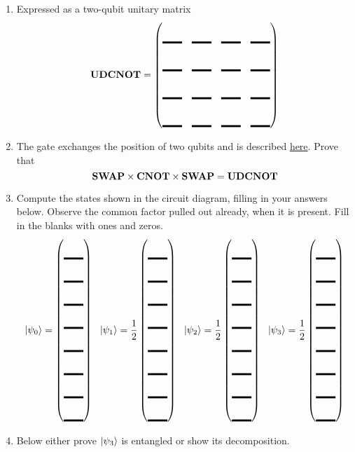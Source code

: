 \documentclass[12pt]{article}
\begin{document}
\begin{enumerate}
\begin{enumerate}[label=\theenumi.\arabic*]
\item Expressed as a two-qubit unitary matrix
\[
\NamedGate{UDCNOT} = \begin{pmatrix*}[r]
\Blank[2em]{} & \Blank[2em]{} & \Blank[2em]{} & \Blank[2em]{}\\[0.5em]
\Blank[2em]{} & \Blank[2em]{} & \Blank[2em]{} & \Blank[2em]{}\\[0.5em]
\Blank[2em]{} & \Blank[2em]{} & \Blank[2em]{} & \Blank[2em]{}\\[0.5em]
\Blank[2em]{} & \Blank[2em]{} & \Blank[2em]{} & \Blank[2em]{}
\end{pmatrix*}
\]
\item The  gate exchanges the position of two qubits and is described \href{https://docs.quantum.ibm.com/api/qiskit/qiskit.circuit.library.SwapGate}{here}. Prove that 
\[
\mbox{\bfseries{\textrm{SWAP}}} \times \mbox{\bfseries{\textrm{CNOT}}} \times \mbox{\bfseries{\textrm{SWAP}}} = \mbox{\bfseries{\textrm{UDCNOT}}}
\]
\LeaveSpace{}
\item Compute the states shown in the circuit diagram, filling in your answers below. Observe the common factor pulled out already, when it is present.  Fill in the blanks with ones and zeros.
\def\FS#1#2{%
\QState{#1} = #2\begin{pmatrix*}[r]
\Blank[2em]{} \\
\Blank[2em]{} \\
\Blank[2em]{} \\
\Blank[2em]{} \\
\Blank[2em]{} \\
\Blank[2em]{} \\
\Blank[2em]{} \\
\Blank[2em]{}
\end{pmatrix*}%
}
\[ \FS{0}{\relax}\ \ 
\FS{1}{\frac{1}{2}}\ \ 
\FS{2}{\frac{1}{2}}\ \ 
\FS{3}{\frac{1}{2}} \]

\item Below either prove $\ket{\psi_{3}}$ is entangled or show its decomposition.
\LeaveSpace{|}
\end{enumerate}


\end{enumerate}
\end{document}
